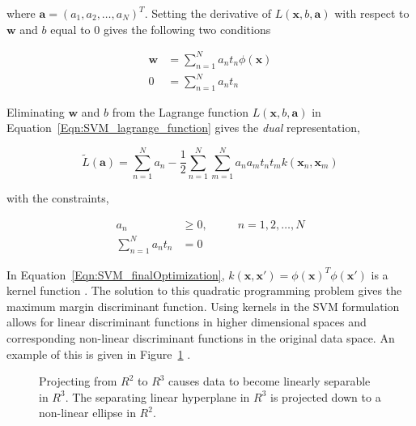 \begin{Body}
where $\mathbf{a} = (a_1, a_2, \ldots, a_N)^T$.  Setting the derivative of $L(\mathbf{x}, b, \mathbf{a})$ with respect to $\mathbf{w}$ and $b$ equal to 0 gives the following two conditions

\begin{align}
\mathbf{w} &= \sum\limits_{n=1}^N a_n t_n \phi(\mathbf{x})\\
0 &=  \sum\limits_{n=1}^N a_n t_n
\end{align}

Eliminating $\mathbf{w}$ and $b$ from the Lagrange function $L(\mathbf{x}, b, \mathbf{a})$ in Equation~\ref{Eqn:SVM_lagrange_function} gives the \emph{dual} representation,

\begin{equation}
\tilde{L}(\mathbf{a}) = \sum\limits_{n=1}^N a_n - \frac{1}{2} \sum\limits_{n=1}^N \sum\limits_{m=1}^N a_n a_m t_n t_m k(\mathbf{x}_n, \mathbf{x}_m)
\label{Eqn:SVM_finalOptimization}
\end{equation}

with the constraints,

\begin{align}
a_n &\geq 0, \ \ \ \ \ \ \ \ \ \ \ \ n = 1, 2, \ldots, N \\
\sum\limits_{n=1}^N a_n t_n &= 0
\end{align}

In Equation~\ref{Eqn:SVM_finalOptimization}, $k(\mathbf{x}, \mathbf{x}') = \phi(\mathbf{x})^T\phi(\mathbf{x}')$ is a kernel function \cite{2007_BOOK_PRML_Bishop}.  The solution to this quadratic programming problem gives the maximum margin discriminant function.  Using kernels in the SVM formulation allows for linear discriminant functions in higher dimensional spaces and corresponding non-linear discriminant functions in the original data space.  An example of this is given in Figure~\ref{fig:SVM_kernel_example} \cite{2007_VID_kernel_Scholkpof}.

								\begin{figure}[t]
								\centering
								\caption{Projecting from $R^2$ to $R^3$ causes data to become linearly separable in $R^3$.  The separating linear hyperplane in $R^3$ is projected down to a non-linear ellipse in $R^2$.}
								\label{fig:SVM_kernel_example}
								\end{figure}







\end{Body}
